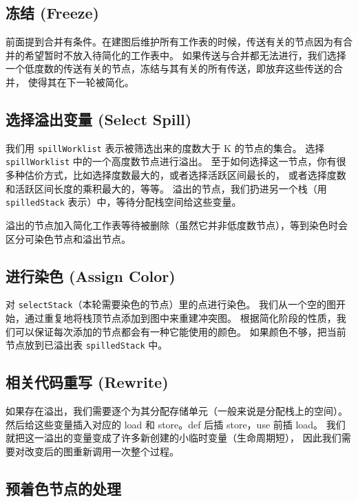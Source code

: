 \subsection{冻结 (Freeze)} \label{opt-graph-freeze}

前面提到合并有条件。在建图后维护所有工作表的时候，传送有关的节点因为有合并的希望暂时不放入待简化的工作表中。
如果传送与合并都无法进行，我们选择一个低度数的传送有关的节点，冻结与其有关的所有传送，即放弃这些传送的合并，
使得其在下一轮被简化。

\subsection{选择溢出变量 (Select Spill)} \label{opt-graph-select-spill}

我们用 \texttt{spillWorklist} 表示被筛选出来的度数大于 K 的节点的集合。
选择 \texttt{spillWorklist} 中的一个高度数节点进行溢出。
至于如何选择这一节点，你有很多种估价方式，比如选择度数最大的，或者选择活跃区间最长的，
或者选择度数和活跃区间长度的乘积最大的，等等。
溢出的节点，我们扔进另一个栈（用 \texttt{spilledStack} 表示）中，等待分配栈空间给这些变量。

溢出的节点加入简化工作表等待被删除（虽然它并非低度数节点），等到染色时会区分可染色节点和溢出节点。

\subsection{进行染色 (Assign Color)} \label{opt-graph-assign-color}

对 \texttt{selectStack}（本轮需要染色的节点）里的点进行染色。
我们从一个空的图开始，通过重复地将栈顶节点添加到图中来重建冲突图。
根据简化阶段的性质，我们可以保证每次添加的节点都会有一种它能使用的颜色。
如果颜色不够，把当前节点放到已溢出表 \texttt{spilledStack} 中。

\subsection{相关代码重写 (Rewrite)} \label{opt-graph-rewrite}

如果存在溢出，我们需要逐个为其分配存储单元（一般来说是分配栈上的空间）。
然后给这些变量插入对应的 load 和 store。def 后插 store，use 前插 load。
我们就把这一溢出的变量变成了许多新创建的小临时变量（生命周期短），
因此我们需要对改变后的图重新调用一次整个过程。

\subsection{预着色节点的处理}


